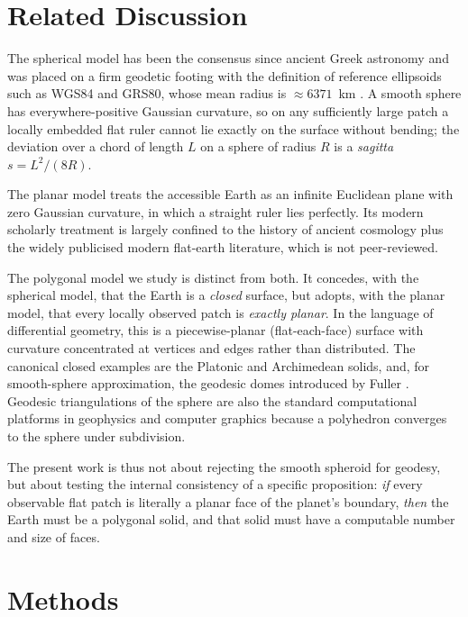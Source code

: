 \documentclass[11pt,a4paper]{article}
\begin{document}
\section{Related Discussion}
\label{sec:related}

The spherical model has been the consensus since ancient Greek astronomy \cite{cohen2010early} and was placed on a firm geodetic footing with the definition of reference ellipsoids such as WGS84 and GRS80, whose mean radius is $\approx 6371$~km \cite{moritz2011geodetic,sears1903earth}. A smooth sphere has everywhere-positive Gaussian curvature, so on any sufficiently large patch a locally embedded flat ruler cannot lie exactly on the surface without bending; the deviation over a chord of length $L$ on a sphere of radius $R$ is a \emph{sagitta} $s = L^2/(8R)$.

The planar model treats the accessible Earth as an infinite Euclidean plane with zero Gaussian curvature, in which a straight ruler lies perfectly. Its modern scholarly treatment is largely confined to the history of ancient cosmology \cite{cohen2010early} plus the widely publicised modern flat-earth literature, which is not peer-reviewed.

The polygonal model we study is distinct from both. It concedes, with the spherical model, that the Earth is a \emph{closed} surface, but adopts, with the planar model, that every locally observed patch is \emph{exactly planar}. In the language of differential geometry, this is a piecewise-planar (flat-each-face) surface with curvature concentrated at vertices and edges rather than distributed. The canonical closed examples are the Platonic and Archimedean solids, and, for smooth-sphere approximation, the geodesic domes introduced by Fuller \cite{fuller1975synergetics}. Geodesic triangulations of the sphere are also the standard computational platforms in geophysics and computer graphics \cite{bauchau2011mesh} because a polyhedron converges to the sphere under subdivision.

The present work is thus not about rejecting the smooth spheroid for geodesy, but about testing the internal consistency of a specific proposition: \emph{if} every observable flat patch is literally a planar face of the planet's boundary, \emph{then} the Earth must be a polygonal solid, and that solid must have a computable number and size of faces.

\section{Methods}
\label{sec:methods}
\end{document}
